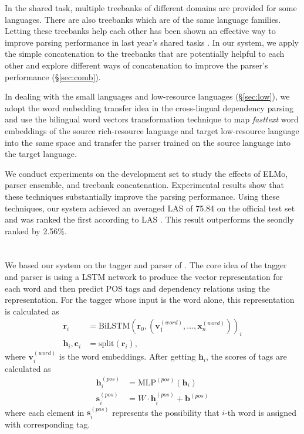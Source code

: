 \documentclass[11pt,a4paper]{article}
\begin{document}
In the shared task, multiple treebanks of different domains are provided for some languages.
There are also treebanks which are of the same language families.
Letting these treebanks help each other has been shown an effective way to improve parsing performance
in last year's shared tasks \citep{che-EtAl:2017:K17-3,shi-EtAl:2017:K17-3,bjorkelund-EtAl:2017:K17-3}.
In our system, we apply the simple concatenation to the treebanks that are potentially
helpful to each other
and explore different ways of concatenation to improve the parser's performance (\S\ref{sec:comb}).

In dealing with the small languages and low-resource languages (\S\ref{sec:low}),
we adopt the word embedding transfer idea 
in the cross-lingual dependency parsing \cite{guo-EtAl:2015:ACL-IJCNLP2}
and use the bilingual word vectors transformation technique \cite{DBLP:journals/corr/SmithTHH17}
to map \textit{fasttext} word embeddings \cite{DBLP:journals/corr/BojanowskiGJM16}
of the source rich-resource language and target low-resource language
into the same space and transfer the parser trained on the source language into the target language.

We conduct experiments on the development set to study
the effects of ELMo, parser ensemble, and treebank concatenation.
Experimental results show that these techniques substantially improve the parsing performance.
Using these techniques, our system achieved an averaged LAS of 75.84 on the official test set
and was ranked the first according to LAS \cite{udst:overview}.
This result outperforms the seondly ranked by 2.56\%.

\section{\citet{dozat-qi-manning:2017:K17-3}}\label{sec:biaffine}

We based our system on the tagger and parser of \citet{dozat-qi-manning:2017:K17-3}.
The core idea of the tagger and parser
is using a LSTM network to produce the vector representation
for each word and then predict POS tags and dependency relations
using the representation.
For the tagger whose input is the word alone,
this representation is calculated as
\begin{align*}
\mathbf{r}_i & =  \text{BiLSTM}(\mathbf{r}_0, (\mathbf{v}_1^{(word)}, ..., \mathbf{x}_n^{(word)}))_i \\
\mathbf{h}_i, \mathbf{c}_i & = \text{split}(\mathbf{r}_i),
\end{align*}
where $\mathbf{v}_i^{(word)}$ is the word embeddings.
After getting $\mathbf{h}_i$,
the scores of tags are calculated as
\begin{align*}
\mathbf{h}_i^{(pos)} & = \text{MLP}^{(pos)} (\mathbf{h}_i) \\
\mathbf{s}_i^{(pos)} & = W \cdot \mathbf{h}_i^{(pos)} + \mathbf{b}^{(pos)}
\end{align*}
where each element in $\mathbf{s}_i^{(pos)}$ represents the possibility
that $i$-th word is assigned with corresponding tag.
\end{document}
